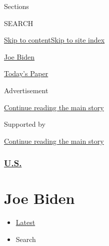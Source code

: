 Sections

SEARCH

\protect\hyperlink{site-content}{Skip to
content}\protect\hyperlink{site-index}{Skip to site index}

\href{https://www.nytimes3xbfgragh.onion/topic/person/joe-biden}{Joe
Biden}

\href{https://myaccount.nytimes3xbfgragh.onion/auth/login?response_type=cookie\&client_id=vi}{}

\href{https://www.nytimes3xbfgragh.onion/section/todayspaper}{Today's
Paper}

Advertisement

\protect\hyperlink{after-top}{Continue reading the main story}

Supported by

\protect\hyperlink{after-sponsor}{Continue reading the main story}

\hypertarget{us}{%
\subsubsection{\texorpdfstring{\href{/section/us}{U.S.}}{U.S.}}\label{us}}

\hypertarget{joe-biden}{%
\section{Joe Biden}\label{joe-biden}}

\begin{itemize}
\tightlist
\item
  \protect\hyperlink{stream-panel}{Latest}
\item
  Search
\end{itemize}

